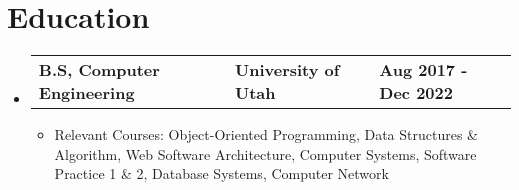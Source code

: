 \documentclass[letterpaper,12pt]{article}
\begin{document}





\section{\textbf{Education}}
\begin{itemize}[leftmargin=0.05in, label={}]
	\item{
	            \begin{tabu} {X[l] X[c] X[r]}
		            \textbf{B.S, Computer Engineering} & \textbf{University of Utah}  & \textbf{Aug 2017 - Dec 2022}
	            \end{tabu}

	            \begin{itemize} [label=$\bullet$]
		            \item{Relevant Courses{: Object-Oriented Programming, Data Structures \& Algorithm, Web Software Architecture, Computer Systems, Software Practice 1 \& 2, Database Systems, Computer Network} }
	            \end{itemize}
	      }
\end{itemize}


\end{document}

